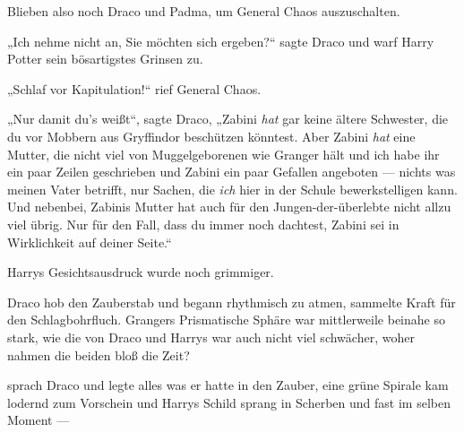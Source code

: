 Blieben also noch Draco und Padma, um General Chaos auszuschalten.

„Ich nehme nicht an, Sie möchten sich ergeben?“ sagte Draco und warf Harry Potter sein bösartigstes Grinsen zu.

„Schlaf vor Kapitulation!“ rief General Chaos.

„Nur damit du’s weißt“, sagte Draco,
„Zabini \emph{hat} gar keine ältere Schwester, die du vor Mobbern aus Gryffindor beschützen könntest. Aber Zabini \emph{hat} eine Mutter, die nicht viel von Muggelgeborenen wie Granger hält und ich habe ihr ein paar Zeilen geschrieben und Zabini ein paar Gefallen angeboten — nichts was meinen Vater betrifft, nur Sachen, die \emph{ich} hier in der Schule bewerkstelligen kann. Und nebenbei, Zabinis Mutter hat auch für den Jungen-der-überlebte nicht allzu viel übrig. Nur für den Fall, dass du immer noch dachtest, Zabini sei in Wirklichkeit auf deiner Seite.“

Harrys Gesichtsausdruck wurde noch grimmiger.

Draco hob den Zauberstab und begann rhythmisch zu atmen, sammelte Kraft für den Schlagbohrfluch. Grangers Prismatische Sphäre war mittlerweile beinahe so stark, wie die von Draco und Harrys war auch nicht viel schwächer, woher nahmen die beiden bloß die Zeit?

 sprach Draco und legte alles was er hatte in den Zauber, eine grüne Spirale kam lodernd zum Vorschein und Harrys Schild sprang in Scherben und fast im selben Moment —


